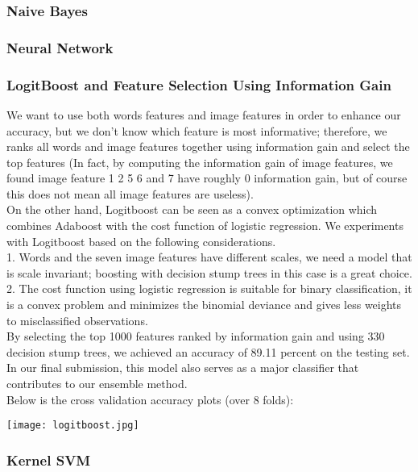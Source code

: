 \subsubsection{Naive Bayes}
\subsubsection{Neural Network}
\subsubsection{LogitBoost and Feature Selection Using Information Gain}
 We want to use both words features and image features in order to enhance our accuracy, but we don't know which feature is most informative; therefore, we ranks all words and image features together using information gain and select the top features (In fact, by computing the information gain of image features, we found image feature 1 2 5 6 and 7 have roughly 0 information gain, but of course this does not mean all image features are useless).\\
On the other hand, Logitboost can be seen as a convex optimization which combines Adaboost with the cost function of logistic regression. We experiments with Logitboost based on the following considerations.\\
1. Words and the seven image features have different scales, we need a model that is scale invariant; boosting with decision stump trees in this case is a great choice.\\
2. The cost function using logistic regression is suitable for binary classification, it is a convex problem and minimizes the binomial deviance and gives less weights to misclassified observations.\\
By selecting the top 1000 features ranked by information gain and using 330 decision stump trees, we achieved an accuracy of 89.11 percent on the testing set.\\
In our final submission, this model also serves as a major classifier that contributes to our ensemble method.\\
Below is the cross validation accuracy plots (over 8 folds):\\
\begin{center}
\texttt{[image: logitboost.jpg]}
\end{center}
\subsubsection{Kernel SVM}
